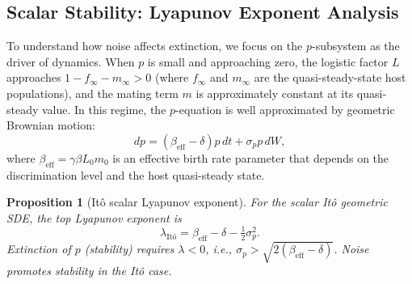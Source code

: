 \documentclass[12pt]{article}
\newtheorem{proposition}{Proposition}
\begin{document}
\subsection{Scalar Stability: Lyapunov Exponent Analysis}

To understand how noise affects extinction, we focus on the $p$-subsystem as the driver of dynamics.  When $p$ is small and approaching zero, the logistic factor $L$ approaches $1 - f_\infty - m_\infty > 0$ (where $f_\infty$ and $m_\infty$ are the quasi-steady-state host populations), and the mating term $m$ is approximately constant at its quasi-steady value.  In this regime, the $p$-equation is well approximated by geometric Brownian motion:
\begin{equation}
  dp = (\beta_{\text{eff}} - \delta)p\,dt + \sigma_p p\,dW,
\end{equation}
where $\beta_{\text{eff}} = \gamma\beta L_0 m_0$ is an effective birth rate parameter that depends on the discrimination level and the host quasi-steady state.

\begin{proposition}[It\^{o} scalar Lyapunov exponent]\label{prop:lyap_ito}
For the scalar It\^{o} geometric SDE, the top Lyapunov exponent is
\begin{equation}
  \lambda_{\text{It\^{o}}} = \beta_{\text{eff}} - \delta - \tfrac{1}{2}\sigma_p^2.
\end{equation}
Extinction of $p$ (stability) requires $\lambda < 0$, i.e., $\sigma_p > \sqrt{2(\beta_{\text{eff}} - \delta)}$.  Noise promotes stability in the It\^{o} case.
\end{proposition}
\end{document}
